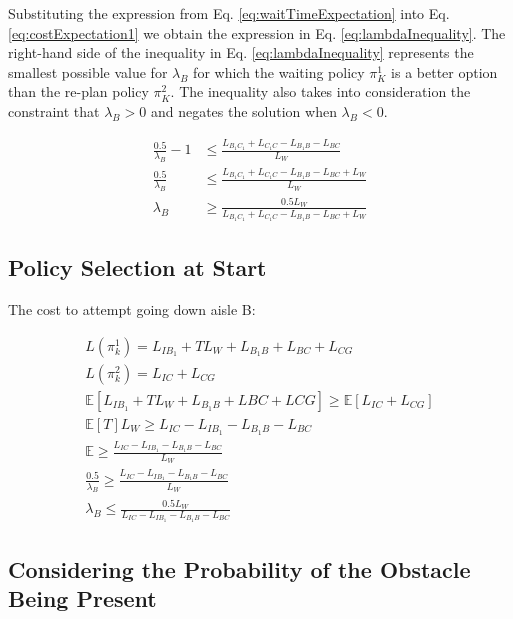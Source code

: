 \documentclass[a4paper,12pt]{article}
\begin{document}
			Substituting the expression from Eq. \ref{eq:waitTimeExpectation} into Eq. \ref{eq:costExpectation1} we obtain the expression in Eq. \ref{eq:lambdaInequality}. The right-hand side of the inequality in Eq. \ref{eq:lambdaInequality} represents the smallest possible value for $\lambda_{B}$ for which the waiting policy $\pi_K^1$ is a better option than the re-plan policy $\pi_K^2$. The inequality also takes into consideration the constraint that $\lambda_{B} > 0$ and negates the solution when $\lambda_{B} < 0$.

			\begin{equation}
				\begin{split}
					\frac{0.5}{\lambda_{B}}-1 & \leq \frac{L_{B_{1}C_{1}} + L_{C_{1}C} - L_{B_{1}B} - L_{BC}}{L_W} \\
					\frac{0.5}{\lambda_{B}}& \leq \frac{L_{B_{1}C_{1}} + L_{C_{1}C} - L_{B_{1}B} - L_{BC}+L_W}{L_W} \\
					\lambda_{B} & \geq \frac{0.5L_W}{L_{B_{1}C_{1}} + L_{C_{1}C} - L_{B_{1}B} - L_{BC}+L_W}
				\end{split}
				\label{eq:lambdaInequality}
			\end{equation}

		\subsection{Policy Selection at Start}
			The cost to attempt going down aisle B:

			\begin{equation}
				\begin{split}
				L(\pi_k^1) =L_{IB_1}+TL_W+L_{B_1B}+L_{BC}+L_{CG}\\
				L(\pi_k^2) = L_{IC}+L_{CG}\\
				\mathbb{E}[L_{IB_1}+TL_W + L_{B_1B}+L{BC}+L{CG}] \geq \mathbb{E}[L_{IC}+L_{CG}]\\
				\mathbb{E}[T]L_W \geq L_{IC}-L_{IB_1}-L_{B_1B}-L_{BC}\\
				\mathbb{E} \geq \frac{L_{IC}-L_{IB_1}-L_{B_1B}-L_{BC}}{L_W}\\
				\frac{0.5}{\lambda_B} \geq \frac{L_{IC}-L_{IB_1}-L_{B_1B}-L_{BC}}{L_W}\\
				\lambda_B \leq \frac{0.5L_W}{L_{IC}-L_{IB_1}-L_{B_1B}-L_{BC}}
				\end{split}
			\end{equation}

		\subsection{Considering the Probability of the Obstacle Being Present}
\end{document}

